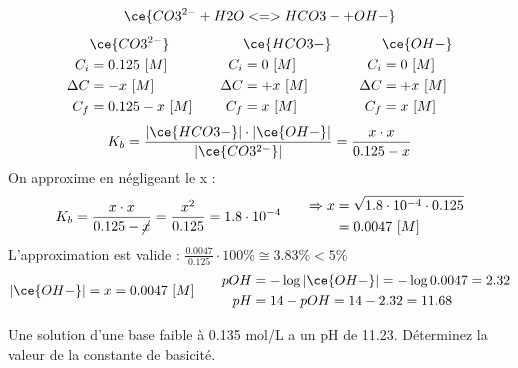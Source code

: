 \documentclass[
  11pt,
  a4paper,
  openany]{book}
\begin{document}
\begin{Answer}
\[
\ce{CO3^{2-} + H2O <=> HCO3- + OH-}
\]
\[
\begin{split}
&\ce{CO3^{2-}}\\
C_i &= 0.125\ [M] \\
\Delta C &= - x\ [M] \\
C_f &= 0.125 - x\ [M] \\
\end{split}
\qquad
\begin{split}
&\ce{HCO3-}\\
C_i &= 0\ [M] \\
\Delta C &= + x\ [M] \\
C_f &= x\ [M] \\
\end{split}
\qquad
\begin{split}
&\ce{OH-}\\
C_i &= 0\ [M] \\
\Delta C &= + x\ [M] \\
C_f &= x\ [M] \\
\end{split}
\]
\[
K_b = \frac{|\ce{HCO3-}| \cdot |\ce{OH-}|}{|\ce{CO3^{2-}}|} = \frac{x \cdot x}{0.125 - x}
\]
On approxime en négligeant le x :
\[
\begin{split}
K_b = \frac{x \cdot x}{0.125 - \cancel{x}} = \frac{x^2}{0.125} = 1.8 \cdot 10^{-4}
\end{split}
\qquad
\begin{split}
\Rightarrow x &= \sqrt{1.8 \cdot 10^{-4} \cdot 0.125} \\
  &= 0.0047\ [M]
\end{split}
\]
L'approximation est valide : \(\frac{0.0047}{0.125} \cdot 100\% \cong 3.83\% < 5\%\)
\[
\begin{split}
|\ce{OH-}| = x = 0.0047\ [M] 
\end{split}
\qquad
\begin{split}
pOH &= - \log |\ce{OH-}| = - \log 0.0047 = 2.32 \\
pH &= 14 - pOH = 14 - 2.32 = 11.68
\end{split}
\]

\end{Answer}

\begin{Exercise}
Une solution d'une base faible à 0.135 mol/L a un pH de 11.23. Déterminez la valeur de la constante de basicité.

\end{Exercise}
\end{document}
